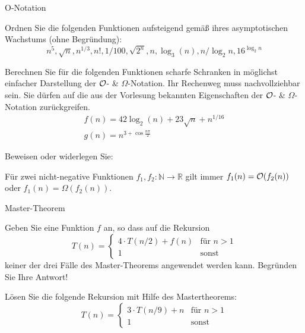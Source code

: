 \documentclass{article}
\begin{document}
\begin{exercises}{O-Notation}
\item Ordnen Sie die folgenden Funktionen aufsteigend gemäß ihres asymptotischen Wachstums (ohne Begründung):
\begin{equation*}
  n^5,\sqrt{n},n^{1/3},n!,1/100,\sqrt{2^n},n,\log_3(n),n/\log_2{n},16^{\log_2{n}}
\end{equation*}
\item Berechnen Sie für die folgenden Funktionen scharfe Schranken in möglichst einfacher Darstellung der $\mathcal{O}$- \& $\Omega$-Notation. Ihr Rechenweg muss nachvollziehbar sein. Sie dürfen auf die aus der Vorlesung bekannten Eigenschaften der $\mathcal{O}$- \& $\Omega$-Notation zurückgreifen.
\begin{align*}
  f(n) = 42\log_2(n) + 23\sqrt{n} + n^{1/16} \\
  g(n) = n^{3+\cos{\frac{n\pi}{2}}}
\end{align*}
\item Beweisen oder widerlegen Sie:\par Für zwei nicht-negative Funktionen $f_1, f_2: \mathbb{N} \to \mathbb{R}$ gilt immer $f_1(n) = \mathcal{O}(f_2(n))$ oder $f_1(n) = \Omega(f_2(n))$.
\end{exercises}

\begin{exercises}{Master-Theorem}
\item Geben Sie eine Funktion $f$ an, so dass auf die Rekursion
\begin{equation*}
  T(n) = \begin{cases}
    4\cdot T(n/2) + f(n) & \text{für } n > 1 \\
    1                    & \text{sonst}
  \end{cases}
\end{equation*}
keiner der drei Fälle des Master-Theorems angewendet werden kann. Begründen Sie Ihre Antwort!
\item Lösen Sie die folgende Rekursion mit Hilfe des Mastertheorems:
\begin{equation*}
  T(n) = \begin{cases}
    3\cdot T(n/9) + n & \text{für } n > 1 \\
    1                 & \text{sonst}
  \end{cases}
\end{equation*}
\end{exercises}
\end{document}
